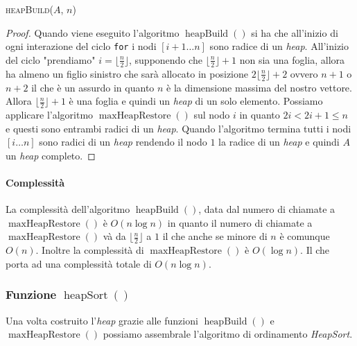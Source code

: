             \begin{algorithm}
                \caption{\textsc{heapBuild}(\Item[] $A$, \Int $n$)}
                \begin{algorithmic}
                        \State {}
                    \EndFor
                \end{algorithmic}
            \end{algorithm}
            \begin{proof}
                Quando viene eseguito l'algoritmo $\operatorname{heapBuild}()$ si ha che all'inizio di ogni interazione del ciclo \texttt{for} i nodi $[i+1\dots n]$ sono radice di un \textit{heap}.\newline
                All'inizio del ciclo "prendiamo" $i = \lfloor \frac{n}2\rfloor$, supponendo che $\lfloor \frac{n}2\rfloor + 1$ non sia una foglia, allora ha almeno un figlio sinistro che sarà allocato in posizione $2\lfloor \frac{n}2\rfloor+2$ ovvero $n+1$ o $n+2$ il che è un assurdo in quanto $n$ è la dimensione massima del nostro vettore. Allora $\lfloor \frac{n}2\rfloor + 1$ è una foglia e quindi un \textit{heap} di un solo elemento.\newline
                Possiamo applicare l'algoritmo $\operatorname{maxHeapRestore}()$ sul nodo $i$ in quanto $2i<2i+1\leq n$ e questi sono entrambi radici di un \textit{heap}. Quando l'algoritmo termina tutti i nodi $[i\dots n]$ sono radici di un \textit{heap} rendendo il nodo $1$ la radice di un \textit{heap} e quindi $A$ un \textit{heap} completo.
            \end{proof}
            \paragraph{Complessità}
                La complessità dell'algoritmo $\operatorname{heapBuild}()$, data dal numero di chiamate a $\operatorname{maxHeapRestore}()$ è $O(n\log n)$ in quanto il numero di chiamate a $\operatorname{maxHeapRestore}()$ và da $\lfloor\frac{n}2\rfloor$ a $1$ il che anche se minore di $n$ è comunque $O(n)$. Inoltre la complessità di $\operatorname{maxHeapRestore}()$ è $O(\log n)$. Il che porta ad una complessità totale di $O(n\log n)$.
        \subsubsection{Funzione $\operatorname{heapSort}()$}
            Una volta costruito l'\textit{heap} grazie alle funzioni $\operatorname{heapBuild}()$ e $\operatorname{maxHeapRestore}()$ possiamo assembrale l'algoritmo di ordinamento \textit{HeapSort}.
